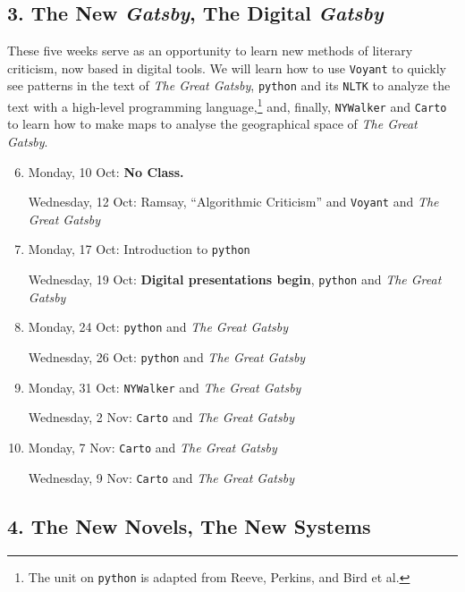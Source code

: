 \subsection*{3. The New \textit{Gatsby}, The Digital \textit{Gatsby}}

  These five weeks serve as an opportunity to learn new methods of literary
  criticism, now based in digital tools. We will learn how to use
  \texttt{Voyant} to quickly see patterns in the text of \textit{The Great
    Gatsby}, \texttt{python} and its \texttt{NLTK} to analyze the text with a
  high-level programming language,\footnote{The unit on \texttt{python} is
    adapted from Reeve, Perkins, and Bird et al.} and, finally,
  \texttt{NYWalker} and \texttt{Carto} to learn how to make maps to analyse the
  geographical space of \textit{The Great Gatsby}.

\begin{enumerate}
  \setcounter{enumi}{5}
 
  \item Monday, 10 Oct: \textbf{No Class.}

    Wednesday, 12 Oct: Ramsay, “Algorithmic Criticism” and \texttt{Voyant} and
    \textit{The Great Gatsby}
  
  \item Monday, 17 Oct: Introduction to \texttt{python}

    Wednesday, 19 Oct: \textbf{\small Digital presentations begin}, \texttt{python} and \textit{The Great Gatsby}

  \item Monday, 24 Oct: \texttt{python} and \textit{The Great Gatsby}

    Wednesday,  26 Oct: \texttt{python} and \textit{The Great Gatsby}

  \item Monday, 31 Oct: \texttt{NYWalker} and \textit{The Great Gatsby}

    Wednesday, 2 Nov: \texttt{Carto} and \textit{The Great Gatsby}

  \item Monday, 7 Nov: \texttt{Carto} and \textit{The Great Gatsby}

    Wednesday, 9 Nov: \texttt{Carto} and \textit{The Great Gatsby}

\end{enumerate}

\subsection*{4. The New Novels, The New Systems}


